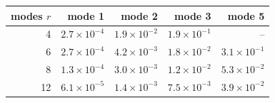 \begin{tabular}{rrrrr}
\toprule
modes $r$ & mode 1 & mode 2 & mode 3 & mode 5 \\
\midrule
4 & $2.7\times10^{-4}$ & $1.9\times10^{-2}$ & $1.9\times10^{-1}$ & -- \\
6 & $2.7\times10^{-4}$ & $4.2\times10^{-3}$ & $1.8\times10^{-2}$ & $3.1\times10^{-1}$ \\
8 & $1.3\times10^{-4}$ & $3.0\times10^{-3}$ & $1.2\times10^{-2}$ & $5.3\times10^{-2}$ \\
12 & $6.1\times10^{-5}$ & $1.4\times10^{-3}$ & $7.5\times10^{-3}$ & $3.9\times10^{-2}$ \\
\bottomrule
\end{tabular}
